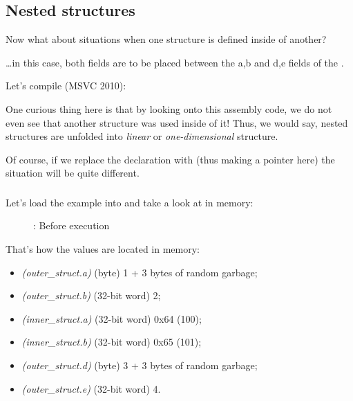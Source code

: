 \subsection{Nested structures}

Now what about situations when one structure is defined inside of another?



\dots in this case, both  fields are to be placed between the a,b and d,e fields of
the .

Let's compile (MSVC 2010):



One curious thing here is that by looking onto this assembly code, we do not even see that
another structure was used inside of it!
Thus, we would say, nested structures are unfolded into \emph{linear} or \emph{one-dimensional} structure.

Of course, if we replace the  declaration with  
(thus making a pointer here) the situation will be quite different.

\clearpage
\subsubsection{\olly}
\myindex{\olly}

Let's load the example into \olly and take a look at 
 in memory:

\begin{figure}[H]
\centering
{}
\caption{\olly: Before \printf execution}
\label{fig:nested_olly}
\end{figure}

That's how the values are located in memory:
\begin{itemize}
\item \emph{(outer\_struct.a)} (byte) 1 + 3 bytes of random garbage;
\item \emph{(outer\_struct.b)} (32-bit word) 2;
\item \emph{(inner\_struct.a)} (32-bit word) 0x64 (100);
\item \emph{(inner\_struct.b)} (32-bit word) 0x65 (101);
\item \emph{(outer\_struct.d)} (byte) 3 + 3 bytes of random garbage;
\item \emph{(outer\_struct.e)} (32-bit word) 4.
\end{itemize}


